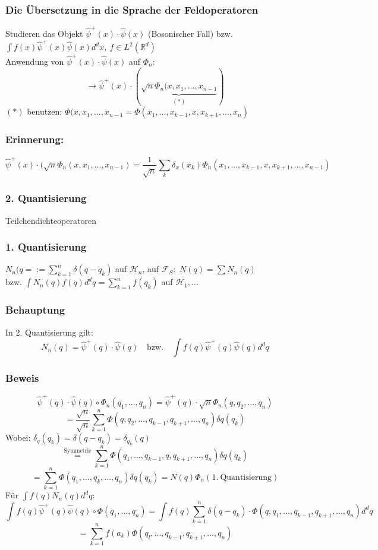 \documentclass[twoside,a4paper]{scrartcl}
\newcommand{\R}{\mathbb{R}}
\renewcommand{\1}{\mathds{1}}
\newcommand{\ra}{\rightarrow}
\renewcommand{\H}{\mathcal{H}}
\newcommand{\F}{\mathcal{F}}
\renewcommand{\R}{\mathbb{R}}
\begin{document}
\subsubsection{Die Übersetzung in die Sprache der Feldoperatoren}
Studieren das Objekt $\hat \psi^+(x) \cdot \hat \psi(x)$ (Bosonischer Fall) bzw. $\int f(x) \hat \psi^+(x)\hat \psi(x)d^dx, \ f\in L^2(\R^d)$\\
Anwendung von $\hat \psi^+(x) \cdot \hat \psi(x)$  auf $\Phi_n$:
$$\ra \hat \psi^+(x) \cdot (\underbrace{\sqrt{n}\Phi_n(x,x_1,...,x_{n-1}}_{(*)})$$
$(*)$ benutzen: $\Phi(x,x_1,...,x_{n-1}=\Phi(x_1,...,x_{k-1},x,x_{k+1},...,x_n)$
\subsubsection*{Erinnerung:}
$$\hat \psi^+(x) \cdot (\sqrt{n}\Phi_n(x,x_1,...,x_{n-1})=\frac{1}{\sqrt{n}} \sum_k \delta_x(x_k) \Phi_n(x_1,...,x_{k-1},x,x_{k+1},...,x_{n-1})$$


% 
\subsubsection*{2. Quantisierung}
Teilchendichteoperatoren
\subsubsection*{1. Quantisierung}
$N_n(q=:=\sum_{k=1}^n\delta(q-q_k)$ auf $\H_n$, auf $\F_S:$ $N(q)=\sum N_n(q)$\\
bzw. $\int N_n(q) f(q)d^dq=\sum_{k=1}^n f(q_k)$ auf $\H_1,...$
\subsubsection*{Behauptung}
In 2. Quantisierung gilt:
$$N_n(q)=\hat \psi^+(q)\cdot \hat \psi(q) \quad \mathrm{bzw.} \quad \int f(q)\hat \psi^+(q)\hat\psi(q)d^dq$$
\subsubsection*{Beweis}
$$\hat \psi^+(q)\cdot \hat \psi(q)\circ \Phi_n(q_1,...,q_n)=\hat \psi^+(q)\cdot \sqrt{n} \Phi_n(q,q_2,...,q_n)$$
$$=\frac{\sqrt{n}}{\sqrt{n}} \sum_{k=1}^n \Phi(q,q_2,...,q_{k-1},q_{k+1},...,q_n) \delta q(q_k)$$
Wobei: $\delta_q(q_k)=\delta(q-q_k)=\delta_{q_k}(q)$
$$\stackrel{\mathrm{Symmetrie}}{=}\sum_{k=1}^n \Phi(q_1,...,q_{k-1},q,q_{k+1},...,q_n) \delta q(q_k)$$
$$=\sum_{k=1}^n \Phi(q_1,...,q_k,...,q_n) \delta q(q_k)=N(q)\Phi_n(1. \ \mathrm{Quantisierung})$$
Für $\int f(q)N_n(q)d^dq$:
$$\int f(q)\hat \psi^+(q)\hat \psi(q) \circ \Phi(q_1,...,q_n)=\int f(q) \sum_{k=1}^n \delta(q-q_k) \cdot \Phi(q,q_1,...,q_{k-1},q_{k+1},...,q_n)d^dq$$
$$=\sum_{k=1}^n f(a_k) \Phi(q_l,...,q_{k-1},q_{k+1},...,q_n)$$
\end{document}
